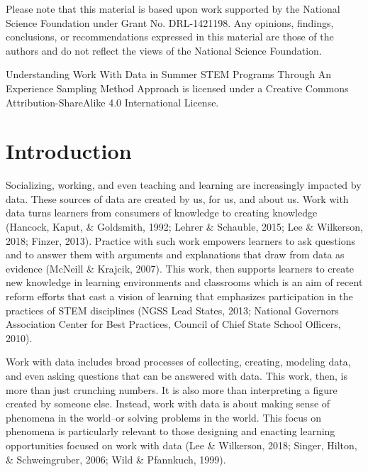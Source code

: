 \documentclass[]{msu-thesis}
\theoremstyle{definition}
\theoremstyle{definition}
\theoremstyle{definition}
\theoremstyle{remark}
\begin{document}
Please note that this material is based upon work supported by the National Science Foundation under Grant No. DRL-1421198. Any opinions, findings, conclusions, or recommendations expressed in this material are those of the authors and do not reflect the views of the National Science Foundation.

Understanding Work With Data in Summer STEM Programs Through An Experience Sampling Method Approach is licensed under a Creative Commons Attribution-ShareAlike 4.0 International License.
\clearpage

\SingleSpacing
\tableofcontents* %
\clearpage
\listoftables %
\clearpage
\listoffigures %
\mainmatter
%

\chapter{Introduction}\label{intro}

\DoubleSpacing

Socializing, working, and even teaching and learning are increasingly
impacted by data. These sources of data are created by us, for us, and
about us. Work with data turns learners from consumers of knowledge to
creating knowledge (Hancock, Kaput, \& Goldsmith, 1992; Lehrer \&
Schauble, 2015; Lee \& Wilkerson, 2018; Finzer, 2013). Practice with
such work empowers learners to ask questions and to answer them with
arguments and explanations that draw from data as evidence (McNeill \&
Krajcik, 2007). This work, then supports learners to create new
knowledge in learning environments and classrooms which is an aim of
recent reform efforts that cast a vision of learning that emphasizes
participation in the practices of STEM disciplines (NGSS Lead States,
2013; National Governors Association Center for Best Practices, Council
of Chief State School Officers, 2010).

Work with data includes broad processes of collecting, creating,
modeling data, and even asking questions that can be answered with data.
This work, then, is more than just crunching numbers. It is also more
than interpreting a figure created by someone else. Instead, work with
data is about making sense of phenomena in the world--or solving
problems in the world. This focus on phenomena is particularly relevant
to those designing and enacting learning opportunities focused on work
with data (Lee \& Wilkerson, 2018; Singer, Hilton, \& Schweingruber,
2006; Wild \& Pfannkuch, 1999).
\end{document}
